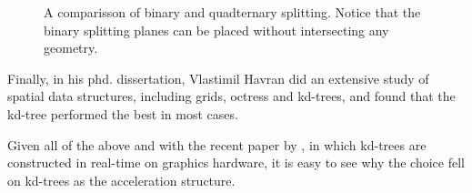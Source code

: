 \begin{figure}
  \centering
  \caption{A comparisson of binary and quadternary splitting. Notice
    that the binary splitting planes can be placed without
    intersecting any geometry.}
  \label{fig:binQuadSplit}
\end{figure}


Finally, in his phd. dissertation, Vlastimil Havran did an extensive
study of spatial data structures, including grids, octress and
kd-trees, and found that the kd-tree performed the best in most cases.

Given all of the above and with the recent paper by \zhou{}, in which
kd-trees are constructed in real-time on graphics hardware, it is easy
to see why the choice fell on kd-trees as the acceleration structure.


